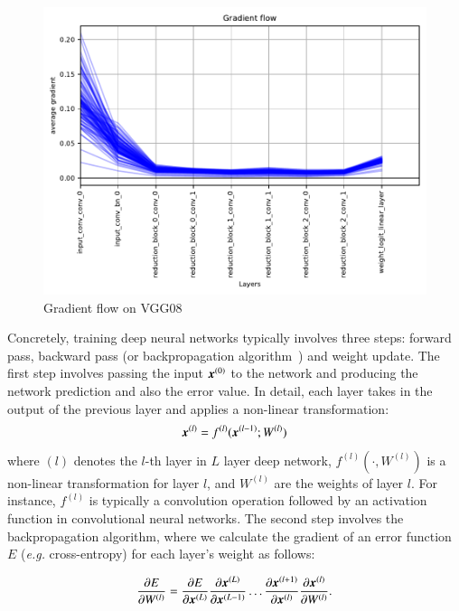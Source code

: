 \documentclass{article}
\begin{document}
\begin{figure}[t]
    \centering
    \includegraphics[width=\linewidth]{figures/grad_flow_vgg08.pdf}
    \caption{Gradient flow on VGG08}
    \label{fig:grad_flow_08}
\end{figure}

\questionFigureThree

Concretely, training deep neural networks typically involves three steps: forward
pass, backward pass (or backpropagation algorithm~\cite{rumelhart1986learning}) and weight update.
The first step involves passing the input $\bm{x}^{(0)}$ to the network and producing 
the network prediction and also the error value.
In detail, each layer takes in the output of the previous layer and applies
a non-linear transformation:
\begin{equation}
\label{eq.fprop}
\bm{x}^{(l)} = f^{(l)}(\bm{x}^{(l-1)}; W^{(l)})    
\end{equation} 
where $(l)$ denotes the $l$-th layer in $L$ layer deep network,
$f^{(l)}(\cdot,W^{(l)})$ is a non-linear transformation for layer $l$, and $W^{(l)}$ are the weights of layer $l$.
For instance, $f^{(l)}$ is typically a convolution operation followed by an activation function in convolutional neural networks.
The second step involves the backpropagation algorithm, where we calculate the gradient of an error function $E$ (\textit{e.g.} cross-entropy) for each layer's weight as follows:

\begin{equation}
    \label{eq.bprop}
\frac{\partial E}{\partial W^{(l)}} = \frac{\partial E}{\partial \bm{x}^{(L)}} \frac{\partial \bm{x}^{(L)}}{\partial \bm{x}^{(L-1)}} \dots \frac{\partial \bm{x}^{(l+1)}}{\partial \bm{x}^{(l)}}\frac{\partial \bm{x}^{(l)}}{\partial W^{(l)}}.
\end{equation}
\end{document}
